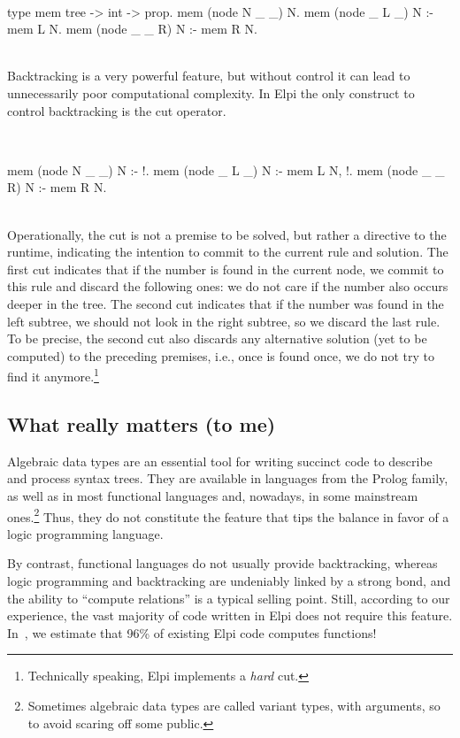 \documentclass[a4paper, 11pt]{book}
\newenvironment{elpicode}
  {\VerbatimEnvironment~\\\begin{elpibox}\begin{xelpicode}}{\end{xelpicode}
\end{elpibox}\\}
\begin{document}
\begin{elpicode}
type mem tree -> int -> prop.
mem (node N _ _) N.
mem (node _ L _) N :- mem L N.
mem (node _ _ R) N :- mem R N.
\end{elpicode}
Backtracking is a very powerful feature, but without control it can lead to
unnecessarily poor computational complexity. In Elpi the only construct to control
backtracking is the cut operator.

\begin{elpicode}
mem (node N _ _) N :- !.
mem (node _ L _) N :- mem L N, !.
mem (node _ _ R) N :- mem R N.
\end{elpicode}
Operationally, the cut is not a premise to be solved, but rather a directive
to the runtime, indicating the intention to commit to the current rule and
solution. The first cut indicates that if the number is found in the current
node, we commit to this rule and discard the following ones: we do not care if
the number also occurs deeper in the tree. The second cut indicates that if
the number was found in the left subtree, we should not look in the right
subtree, so we discard the last rule. To be precise, the second cut
also discards any alternative solution (yet to be computed) to the preceding
premises, i.e., once  is found once, we do not try
to find it anymore.\footnote{Technically speaking, Elpi implements a \emph{hard}
cut.}

\subsection{What really matters (to me)}


Algebraic data types are an essential tool for writing succinct code to
describe and process syntax trees. They are available in languages from the
Prolog family, as well as in most functional languages and, nowadays,
in some mainstream ones.\footnote{Sometimes algebraic data types are
called variant types, with arguments, so to avoid scaring off some public.}
Thus, they do not
constitute the feature that tips the balance in favor of a logic programming
language.

By contrast, functional languages do not usually provide backtracking, whereas
logic programming and backtracking are undeniably linked by a strong bond, and
the ability to ``compute relations'' is a typical selling point. Still,
according to our experience, the vast majority of code written in Elpi does
not require this feature. In~\cite{elpidet}, we estimate that 96\% of existing
Elpi code computes functions!
\end{document}
